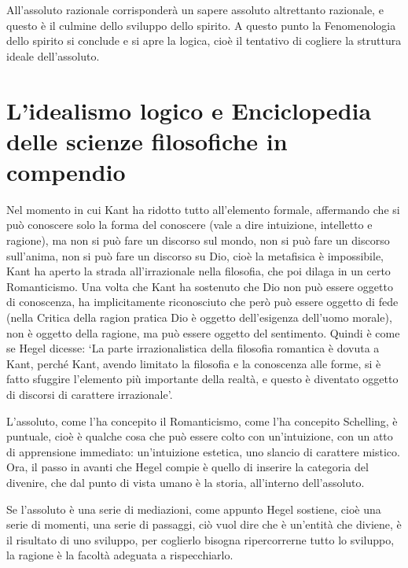 \documentclass[a4paper,12pt,oneside,openany]{book}%
\begin{document}
All’assoluto razionale corrisponderà un sapere assoluto altrettanto razionale, e questo è il culmine dello sviluppo dello spirito. A questo punto la Fenomenologia dello spirito si conclude e si apre la logica, cioè il tentativo di cogliere la struttura ideale dell’assoluto.

\section*{L'idealismo logico e Enciclopedia delle scienze filosofiche in compendio}

Nel momento in cui Kant ha ridotto tutto all’elemento formale, affermando che si può conoscere solo la forma del conoscere (vale a dire intuizione, intelletto e ragione), ma non si può fare un discorso sul mondo, non si può fare un discorso sull’anima, non si può fare un discorso su Dio, cioè la metafisica è impossibile, Kant ha aperto la strada all’irrazionale nella filosofia, che poi dilaga in un certo Romanticismo. Una volta che Kant ha sostenuto che Dio non può essere oggetto di conoscenza, ha implicitamente riconosciuto che però può essere oggetto di fede (nella Critica della ragion pratica Dio è oggetto dell’esigenza dell’uomo morale), non è oggetto della ragione, ma può essere oggetto del sentimento. Quindi è come se Hegel dicesse: ‘La parte irrazionalistica della filosofia romantica è dovuta a Kant, perché Kant, avendo limitato la filosofia e la conoscenza alle forme, si è fatto sfuggire l’elemento più importante della realtà, e questo è diventato oggetto di discorsi di carattere irrazionale’.

L’assoluto, come l’ha concepito il Romanticismo, come l’ha concepito Schelling, è puntuale, cioè è qualche cosa che può essere colto con un’intuizione, con un atto di apprensione immediato: un’intuizione estetica, uno slancio di carattere mistico. Ora, il passo in avanti che Hegel compie è quello di inserire la categoria del divenire, che dal punto di vista umano è la storia, all’interno dell’assoluto. 

Se l’assoluto è una serie di mediazioni, come appunto Hegel sostiene, cioè una serie di momenti, una serie di passaggi, ciò vuol dire che è un’entità che diviene, è il risultato di uno sviluppo, per coglierlo bisogna ripercorrerne tutto lo sviluppo, la ragione è la facoltà adeguata a rispecchiarlo.
\end{document}
